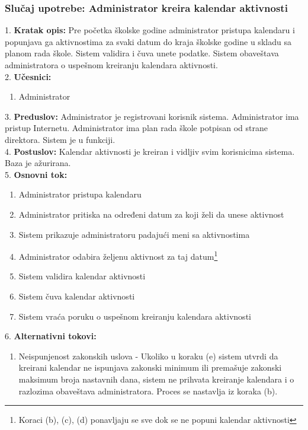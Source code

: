\documentclass{article}
\begin{document}
\newpage
\subsubsection{Slučaj upotrebe: Administrator kreira kalendar aktivnosti}
1. \textbf{Kratak opis:} Pre početka školske godine administrator pristupa kalendaru i popunjava ga aktivnostima za svaki datum do kraja školske godine u skladu sa planom rada škole. Sistem validira i čuva unete podatke. Sistem obaveštava administratora o uspešnom kreiranju kalendara aktivnosti. \\ 

2. \textbf{Učesnici:}
\begin{enumerate} [label=(\alph*)]
\item Administrator
\end{enumerate} 

3. \textbf{Preduslov:} Administrator je registrovani korisnik sistema. Administrator ima pristup Internetu. Administrator ima plan rada škole potpisan od strane direktora. Sistem je u funkciji. \\

4. \textbf{Postuslov:} Kalendar aktivnosti je kreiran i vidljiv svim korisnicima sistema. Baza je ažurirana. \\

5. \textbf{Osnovni tok:} 
\begin{enumerate} [label=(\alph*)]
\item Administrator pristupa kalendaru
\item Administrator pritiska na određeni datum za koji želi da unese aktivnost
\item Sistem prikazuje administratoru padajući meni sa aktivnostima
\item Administrator odabira željenu aktivnost za taj datum\footnote{Koraci (b), (c), (d) ponavljaju se sve dok se ne popuni kalendar aktivnosti}
\item Sistem validira kalendar aktivnosti
\item Sistem čuva kalendar aktivnosti
\item Sistem vraća poruku o uspešnom kreiranju kalendara aktivnosti
\end{enumerate}

6. \textbf{Alternativni tokovi:}
\begin{enumerate} [label=(\roman*)]
\item Neispunjenost zakonskih uslova - Ukoliko u koraku (e) sistem utvrdi da kreirani kalendar ne ispunjava zakonski minimum ili premašuje zakonski maksimum broja nastavnih dana, sistem ne prihvata kreiranje kalendara i o razlozima obaveštava administratora. Proces se nastavlja iz koraka (b).
\end{enumerate}
\end{document}
